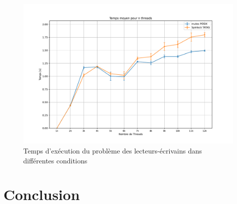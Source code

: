 \begin{figure}[h!]
    \centering
    \includegraphics[scale=0.5]{img/readwrt.pdf}
    \caption{Temps d'exécution du problème des lecteurs-écrivains dans différentes conditions}
    \label{pic:readwrt}
\end{figure}



\section{Conclusion}